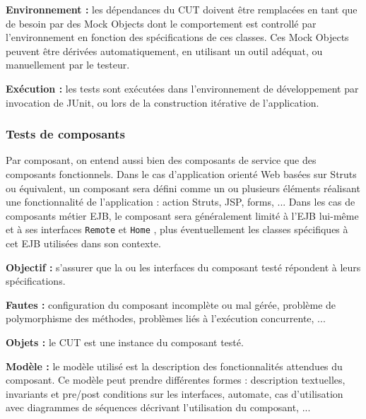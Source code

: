 \textbf{Environnement :}
  les d\'ependances du CUT doivent
      \^etre remplac\'ees en tant que de besoin par des Mock Objects
      dont le comportement est controll\'e par l'environnement en
      fonction des sp\'ecifications de ces classes. Ces Mock Objects
      peuvent \^etre d\'eriv\'ees automatiquement, en utilisant un
      outil ad\'equat, ou manuellement par le testeur.

\par
  
\textbf{Ex\'ecution :}
   les tests sont ex\'ecut\'ees dans
      l'environnement de d\'eveloppement par invocation de JUnit, ou
      lors de la construction it\'erative de l'application.
\par
  
\subsubsection{Tests de composants}
  
    Par composant, on entend aussi bien des composants de service que
    des composants fonctionnels. Dans le cas d'application orient\'e
    Web bas\'ees sur Struts ou \'equivalent, un composant sera
    d\'efini comme un ou plusieurs \'el\'ements r\'ealisant une
    fonctionnalit\'e de l'application : action Struts, JSP, forms,
    ... Dans les cas de composants m\'etier  EJB, le composant sera
    g\'en\'eralement limit\'e \`a l'EJB lui-m\^eme et \`a ses
    interfaces 
\texttt{Remote}
   et 
\texttt{Home}
  , plus
    \'eventuellement les classes sp\'ecifiques \`a cet EJB
    utilis\'ees dans son contexte.
    
\textbf{Objectif :}
   s'assurer que la ou les interfaces du composant test\'e
    r\'epondent \`a leurs sp\'ecifications.
\par
  
\textbf{Fautes :}
   configuration du composant incompl\`ete ou
    mal g\'er\'ee, probl\`eme de polymorphisme des m\'ethodes,
    probl\`emes li\'es \`a l'ex\'ecution concurrente, ...
\par
  
\textbf{Objets :}
   le CUT est une instance du composant test\'e.
\par
  
\textbf{Mod\`ele :}
   le mod\`ele utilis\'e est la description
    des fonctionnalit\'es attendues du composant. Ce mod\`ele peut prendre
    diff\'erentes formes : description textuelles, invariants et
    pre/post conditions sur les interfaces, automate, cas
    d'utilisation avec diagrammes de s\'equences d\'ecrivant
    l'utilisation du composant, ...

